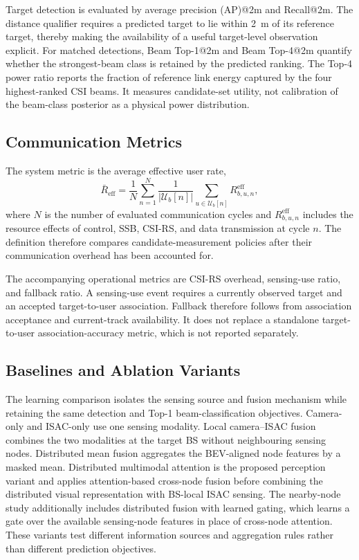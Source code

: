 Target detection is evaluated by average precision (AP)@2m and Recall@2m.  The distance qualifier
requires a predicted target to lie within 2~m of its reference target, thereby
making the availability of a useful target-level observation explicit.  For
matched detections, Beam Top-1@2m and Beam Top-4@2m quantify whether the
strongest-beam class is retained by the predicted ranking.  The Top-4 power
ratio reports the fraction of reference link energy captured by the four
highest-ranked CSI beams.  It measures candidate-set utility, not calibration of
the beam-class posterior as a physical power distribution.

\subsection{Communication Metrics}
\label{subsec:experiments-system-protocol}

The system metric is the average effective user rate,
\begin{equation}
\bar{R}_{\mathrm{eff}}
 =
 \frac{1}{N}\sum_{n=1}^{N}
 \frac{1}{|\mathcal{U}_b[n]|}
 \sum_{u\in\mathcal{U}_b[n]}R_{b,u,n}^{\mathrm{eff}},
\label{eq:experiments-effective-rate}
\end{equation}
where \(N\) is the number of evaluated communication cycles and
\(R_{b,u,n}^{\mathrm{eff}}\) includes the resource effects of control, SSB,
CSI-RS, and data transmission at cycle \(n\).  The definition therefore compares
candidate-measurement policies after their communication overhead has been
accounted for.

The accompanying operational metrics are CSI-RS overhead, sensing-use ratio,
and fallback ratio.  A
sensing-use event requires a currently observed target and an accepted
target-to-user association.  Fallback therefore follows from association
acceptance and current-track availability.  It does not replace a standalone
target-to-user association-accuracy metric, which is not reported separately.

\subsection{Baselines and Ablation Variants}
\label{subsec:experiments-baselines}

The learning comparison isolates the sensing source and fusion mechanism while
retaining the same detection and Top-1 beam-classification objectives.
Camera-only and ISAC-only use one sensing modality.  Local camera--ISAC fusion
combines the two modalities at the target BS without neighbouring sensing
nodes.  Distributed mean fusion aggregates the BEV-aligned node features by a
masked mean.  Distributed multimodal attention is the proposed perception
variant and applies attention-based cross-node fusion before combining the
distributed visual representation with BS-local ISAC sensing.  The nearby-node
study additionally includes distributed fusion with learned gating, which
learns a gate over the available sensing-node features in place of cross-node
attention.  These variants test different information sources and aggregation
rules rather than different prediction objectives.

